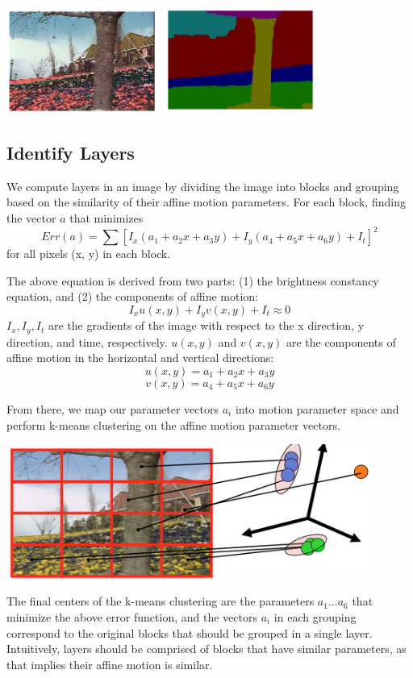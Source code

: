 \documentclass{article}
\begin{document}
\includegraphics[width=5cm]{treeOriginal.png}
\includegraphics[width=5cm]{treeLayer.png}

\subsection{Identify Layers}
We compute layers in an image by dividing the image into blocks and grouping based on the similarity of their affine motion parameters. For each block, finding the vector $a$ that minimizes
\[Err(a) = \sum[I_x(a_1 + a_2x + a_3y) + I_y(a_4 + a_5x + a_6y) + I_t]^2\]
for all pixels (x, y) in each block.

The above equation is derived from two parts:
(1) the brightness constancy equation, and (2) the components of affine motion:
\[I_xu(x, y) + I_yv(x, y) + I_t \approx 0\]
$I_x, I_y, I_t$ are the gradients of the image with respect to the x direction, y direction, and time, respectively.
$u(x, y)$ and $v(x, y)$ are the components of affine motion in the horizontal and vertical directions:
\[u(x, y) = a_1 + a_2x + a_3y\]
\[v(x, y) = a_4 + a_5x + a_6y\]

From there, we map our parameter vectors $a_i$ into motion parameter space and perform k-means clustering on the affine motion parameter vectors. 

\includegraphics[width=12cm]{grouping.png}


The final centers of the k-means clustering are the parameters $a_1 ... a_6$ that minimize the above error function, and the vectors $a_i$ in each grouping correspond to the original blocks that should be grouped in a single layer. Intuitively, layers should be comprised of blocks that have similar parameters, as that implies their affine motion is similar. 


\small


\end{document}
